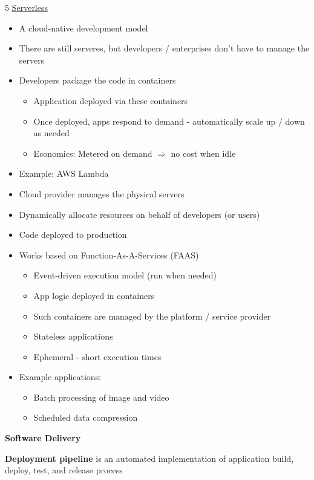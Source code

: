 \documentclass[landscape,a4paper]{extarticle}
\begin{document}
\begin{multicols*}{5}
    \uline{Serverless}
    \begin{itemize}
        \item A cloud-native development model
        \item There are still serveres, but developers / enterprises don't have to manage the servers
        \item Developers package the code in containers
        \begin{itemize}
            \item Application deployed via these containers
            \item Once deployed, apps respond to demand - automatically scale up / down as needed
            \item Economics: Metered on demand $\Rightarrow$ no cost when idle
        \end{itemize}
        \item Example: AWS Lambda
        \item Cloud provider manages the physical servers
        \item Dynamically allocate resources on behalf of developers (or users)
        \item Code deployed to production
        \item Works based on Function-As-A-Services (FAAS)
        \begin{itemize}
            \item Event-driven execution model (run when needed)
            \item App logic deployed in containers
            \item Such containers are managed by the platform / service provider
            \item Stateless applications
            \item Ephemeral - short execution times
        \end{itemize}
        \item Example applications:
        \begin{itemize}
            \item Batch processing of image and video
            \item Scheduled data compression
        \end{itemize}
    \end{itemize}

    \textbf{Software Delivery}

    \textbf{Deployment pipeline} is an automated implementation of application build, deploy, test, and release process
    

\end{multicols*}
\end{document}
